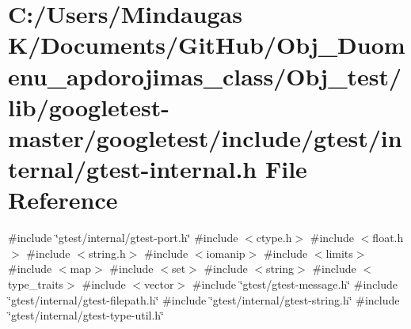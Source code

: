 \hypertarget{_obj__test_2lib_2googletest-master_2googletest_2include_2gtest_2internal_2gtest-internal_8h}{}\section{C\+:/\+Users/\+Mindaugas K/\+Documents/\+Git\+Hub/\+Obj\+\_\+\+Duomenu\+\_\+apdorojimas\+\_\+class/\+Obj\+\_\+test/lib/googletest-\/master/googletest/include/gtest/internal/gtest-\/internal.h File Reference}
\label{_obj__test_2lib_2googletest-master_2googletest_2include_2gtest_2internal_2gtest-internal_8h}
{\ttfamily \#include \char`\"{}gtest/internal/gtest-\/port.\+h\char`\"{}}\newline
{\ttfamily \#include $<$ctype.\+h$>$}\newline
{\ttfamily \#include $<$float.\+h$>$}\newline
{\ttfamily \#include $<$string.\+h$>$}\newline
{\ttfamily \#include $<$iomanip$>$}\newline
{\ttfamily \#include $<$limits$>$}\newline
{\ttfamily \#include $<$map$>$}\newline
{\ttfamily \#include $<$set$>$}\newline
{\ttfamily \#include $<$string$>$}\newline
{\ttfamily \#include $<$type\+\_\+traits$>$}\newline
{\ttfamily \#include $<$vector$>$}\newline
{\ttfamily \#include \char`\"{}gtest/gtest-\/message.\+h\char`\"{}}\newline
{\ttfamily \#include \char`\"{}gtest/internal/gtest-\/filepath.\+h\char`\"{}}\newline
{\ttfamily \#include \char`\"{}gtest/internal/gtest-\/string.\+h\char`\"{}}\newline
{\ttfamily \#include \char`\"{}gtest/internal/gtest-\/type-\/util.\+h\char`\"{}}\newline

